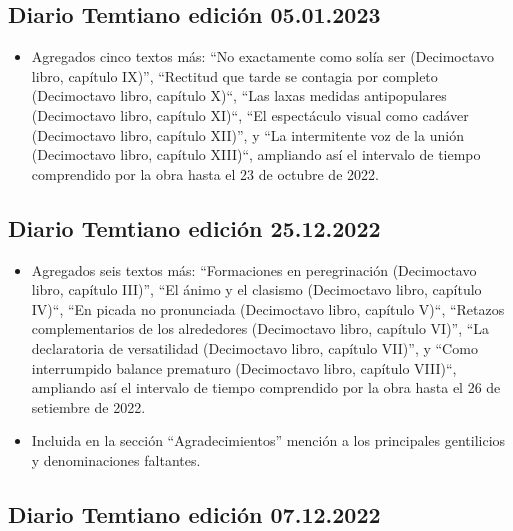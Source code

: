 \documentclass[
]{book}
\providecommand{\tightlist}{%
  \setlength{\itemsep}{0pt}\setlength{\parskip}{0pt}}
\begin{document}
\hypertarget{diario-temtiano-ediciuxf3n-05.01.2023}{%
\subsection*{Diario Temtiano edición 05.01.2023}\label{diario-temtiano-ediciuxf3n-05.01.2023}}

\begin{itemize}
\tightlist
\item
  Agregados cinco textos más: ``No exactamente como solía ser (Decimoctavo libro, capítulo IX)'', ``Rectitud que tarde se contagia por completo (Decimoctavo libro, capítulo X)``, ``Las laxas medidas antipopulares (Decimoctavo libro, capítulo XI)``, ``El espectáculo visual como cadáver (Decimoctavo libro, capítulo XII)'', y ``La intermitente voz de la unión (Decimoctavo libro, capítulo XIII)``, ampliando así el intervalo de tiempo comprendido por la obra hasta el 23 de octubre de 2022.
\end{itemize}

\hypertarget{diario-temtiano-ediciuxf3n-25.12.2022}{%
\subsection*{Diario Temtiano edición 25.12.2022}\label{diario-temtiano-ediciuxf3n-25.12.2022}}

\begin{itemize}
\item
  Agregados seis textos más: ``Formaciones en peregrinación (Decimoctavo libro, capítulo III)'', ``El ánimo y el clasismo (Decimoctavo libro, capítulo IV)``, ``En picada no pronunciada (Decimoctavo libro, capítulo V)``, ``Retazos complementarios de los alrededores (Decimoctavo libro, capítulo VI)'', ``La declaratoria de versatilidad (Decimoctavo libro, capítulo VII)'', y ``Como interrumpido balance prematuro (Decimoctavo libro, capítulo VIII)``, ampliando así el intervalo de tiempo comprendido por la obra hasta el 26 de setiembre de 2022.
\item
  Incluida en la sección ``Agradecimientos'' mención a los principales gentilicios y denominaciones faltantes.
\end{itemize}

\hypertarget{diario-temtiano-ediciuxf3n-07.12.2022}{%
\subsection*{Diario Temtiano edición 07.12.2022}\label{diario-temtiano-ediciuxf3n-07.12.2022}}
\end{document}
